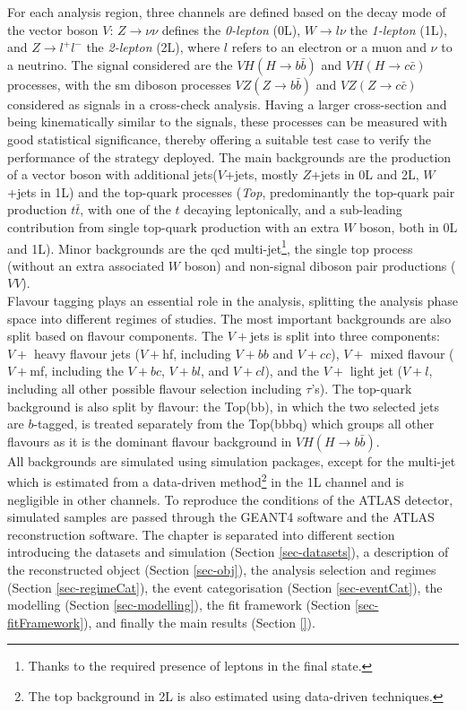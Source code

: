 For each analysis region, three channels are defined based on the decay mode of the vector boson $V$: $Z \rightarrow \nu \nu$ defines the \textit{0-lepton} (0L), $W \rightarrow l \nu $ the \textit{1-lepton} (1L), and $Z \rightarrow l^+ l^-$ the \textit{2-lepton} (2L), where $l$ refers to an electron or a muon and $\nu$ to a neutrino. The signal considered are the  $VH (H\rightarrow b\bar{b})$ and $VH (H\rightarrow c\bar{c})$ processes, with the \gls{sm} diboson processes $VZ (Z\rightarrow b\bar{b})$ and $VZ (Z\rightarrow c\bar{c})$ considered as signals in a cross-check analysis. Having a larger cross-section and being kinematically similar to the signals, these processes can be measured with good statistical significance, thereby offering a suitable test case to verify the performance of the strategy deployed. The main backgrounds are the production of a vector boson with additional jets($V$+jets, mostly $Z$+jets in 0L and 2L, $W$+jets in 1L) and the top-quark processes (\textit{Top}, predominantly the top-quark pair production $t\bar{t}$, with one of the $t$ decaying leptonically, and a sub-leading contribution from single top-quark production with an extra $W$ boson, both in 0L and 1L). Minor backgrounds are the \gls{qcd} multi-jet\footnote{Thanks to the required presence of leptons in the final state.}, the single top process (without an extra associated $W$ boson) and non-signal diboson pair productions ($VV$). \\ 

Flavour tagging plays an essential role in the analysis, splitting the analysis phase space into different regimes of studies. The most important backgrounds are also split based on flavour components. The $V+$jets is split into three components: $V+$ heavy flavour jets ($V+$hf, including $V+bb$ and $V+cc$), $V+$ mixed flavour ($V+$mf, including the $V+bc$, $V+bl$, and $V+cl$), and the $V+$ light jet ($V+l$, including all other possible flavour selection including $\tau$'s). The top-quark background is also split by flavour: the Top(bb), in which the two selected jets are $b$-tagged, is treated separately from the Top(bbbq) which groups all other flavours as it is the dominant flavour background in $VH(H\rightarrow b\bar{b})$. \\

All backgrounds are simulated using  simulation packages, except for the multi-jet which is estimated from a data-driven method\footnote{The top background in 2L is also estimated using data-driven techniques.} in the 1L channel and is negligible in other channels. To reproduce the conditions of the ATLAS detector, simulated samples are passed through the GEANT4 software \cite{Agostinelli:602040} and the ATLAS reconstruction software. The chapter is separated into different section introducing the datasets and simulation (Section \ref{sec-datasets}), a description of the reconstructed object (Section \ref{sec-obj}), the analysis selection and regimes (Section \ref{sec-regimeCat}), the event categorisation (Section \ref{sec-eventCat}), the modelling (Section \ref{sec-modelling}), the fit framework (Section \ref{sec-fitFramework}), and finally the main results (Section \ref{}).


